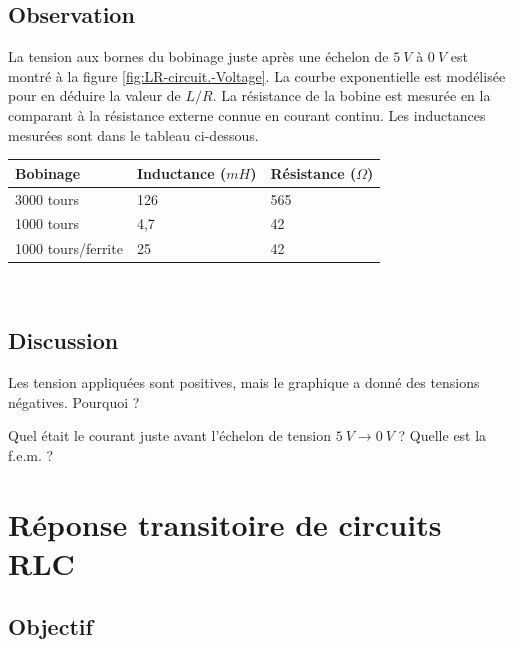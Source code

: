 \documentclass{book}
\begin{document}
\subsection{Observation}


La tension aux bornes du bobinage juste après une échelon de $5\ V$ à $0\ V$ est montré à la figure  \ref{fig:LR-circuit.-Voltage}. La courbe exponentielle est modélisée pour en déduire la valeur de $L/R$. La résistance de la bobine est mesurée en la comparant à la résistance externe connue en courant continu. Les inductances mesurées sont dans le tableau ci-dessous.



\begin{tabular}{|l|l|l|}
\hline
\textbf{Bobinage}&\textbf{Inductance ($mH$)}&\textbf{Résistance ($\Omega$)}
\\ \hline
3000 tours&126&565
\\ \hline
1000 tours&4,7&42
\\ \hline
1000 tours/ferrite&25&42
\\ \hline
\end{tabular}\\[0.5em]

\subsection{Discussion}


Les tension appliquées sont positives, mais le graphique a donné des tensions négatives. Pourquoi ?



Quel était le courant juste avant l'échelon de tension $5\ V\rightarrow 0\ V$ ? Quelle est la f.e.m. ?










\section{Réponse transitoire de circuits RLC}


 \label{sec:Step-Response-ofRLC}

\subsection{Objectif}
\end{document}
